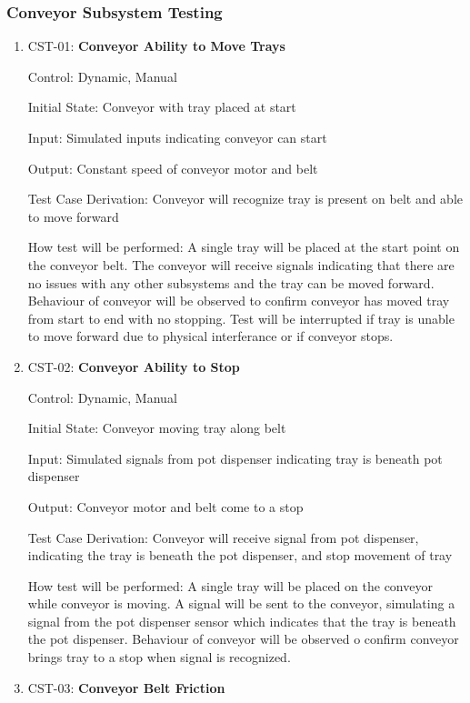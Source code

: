 \documentclass[12pt, titlepage]{article}
\begin{document}
\subsubsection{Conveyor Subsystem Testing}

\begin{enumerate}
\item{CST-01: \textbf{Conveyor Ability to Move Trays}\\}

Control: Dynamic, Manual

Initial State: Conveyor with tray placed at start

Input: Simulated inputs indicating conveyor can start

Output: Constant speed of conveyor motor and belt

Test Case Derivation: Conveyor will recognize tray is present on belt and able to move forward

How test will be performed: A single tray will be placed at the start point on the conveyor belt. The conveyor 
will receive signals indicating that there are no issues with any other subsystems and the tray can be moved 
forward. Behaviour of conveyor will be observed to confirm conveyor has moved tray from start to end with no 
stopping. Test will be interrupted if tray is unable to move forward due to physical interferance or if conveyor stops.

\item{CST-02: \textbf{Conveyor Ability to Stop}\\}

Control: Dynamic, Manual

Initial State: Conveyor moving tray along belt

Input: Simulated signals from pot dispenser indicating tray is beneath pot dispenser

Output: Conveyor motor and belt come to a stop

Test Case Derivation: Conveyor will receive signal from pot dispenser, indicating the tray is beneath the pot
dispenser, and stop movement of tray

How test will be performed: A single tray will be placed on the conveyor while conveyor is moving. A signal will be 
sent to the conveyor, simulating a signal from the pot dispenser sensor which indicates that the tray is beneath 
the pot dispenser. Behaviour of conveyor will be observed o confirm conveyor brings tray to a stop when signal is 
recognized.

\item{CST-03: \textbf{Conveyor Belt Friction}\\}


\end{enumerate}
\end{document}
